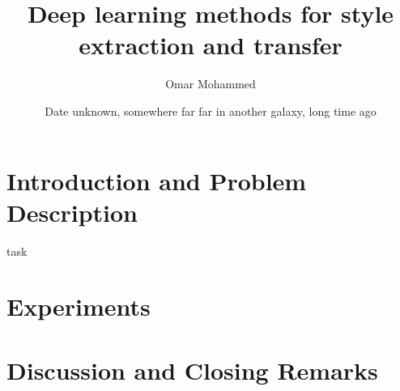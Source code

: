 \documentclass[11pt,a4paper,twoside, leqno]{book}
\title{Deep learning methods for style extraction and transfer}
\author{Omar Mohammed}
\date{Date unknown, somewhere far far in another galaxy, long time ago}
\begin{document}
\maketitle

\dominitoc%
\tableofcontents

\listoffigures

\listoftables

\part{Introduction and Problem Description}


\Gls{task}



\part{Experiments}






\part{Discussion and Closing Remarks}




\appendix



\printglossaries

\printindex

% 
{\small }
\end{document}
